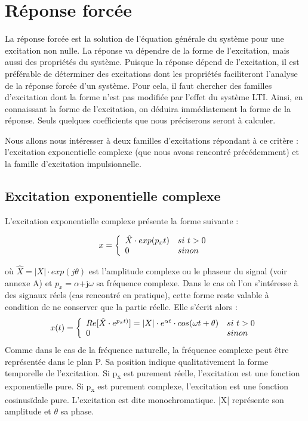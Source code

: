 	
	\section{Réponse forcée}
	
	La réponse forcée est la solution de l'équation générale du système pour une excitation non nulle. La réponse va dépendre de la forme de l'excitation, mais aussi des
	propriétés du système. Puisque la réponse dépend de l'excitation, il est
	préférable de déterminer des excitations dont les propriétés
	faciliteront l'analyse de la réponse forcée d'un système. Pour cela, il
	faut chercher des familles d'excitation dont la forme n'est pas modifiée
	par l'effet du système LTI. Ainsi, en connaissant la forme de
	l'excitation, on déduira immédiatement la forme de la réponse. Seuls
	quelques coefficients que nous préciserons seront à calculer.
	
	Nous allons nous intéresser à deux familles d'excitations répondant à ce critère : l'excitation
	exponentielle complexe (que nous avons rencontré précédemment) et la
	famille d'excitation impulsionnelle.
	
	\subsection{Excitation exponentielle complexe}
	L'excitation exponentielle complexe présente la forme suivante :
	
	\begin{equation}\label{exc_expo_complexe}
		x =    \left \{
		\begin{array}{l l}
		\hat{X} \cdot exp(p_{x}t)  & si~t>0 \\
		0   & sinon \\
		\end{array}
		\right .
	\end{equation}
	
	où $ \hat{X} = |X| \cdot exp(j \theta)$ est l'amplitude complexe ou le phaseur du signal (voir annexe A) et $ p_{x} = \alpha $+j$ \omega $ sa fréquence complexe. Dans le cas où l'on s'intéresse à des signaux réels (cas rencontré en pratique), cette forme reste valable à condition de ne conserver que la partie réelle. Elle s'écrit alors :
	\begin{equation}\label{exc_expo_complexe_reel}
	x(t) =    \left \{
	\begin{array}{l l}
	Re[\hat{X} \cdot e^{p_{x}t)}] = |X| \cdot e^{\alpha t} \cdot cos(\omega t+\theta)  & si~t>0 \\
	0   & sinon \\
	\end{array}
	\right .
	\end{equation}
	Comme dans le cas de la fréquence naturelle, la fréquence complexe peut
	être représentée dans le plan P. Sa position indique qualitativement la
	forme temporelle de l'excitation. Si p\textsubscript{x} est purement
	réelle, l'excitation est une fonction exponentielle pure. Si
	p\textsubscript{x} est purement complexe, l'excitation est une fonction
	cosinusïdale pure. L'excitation est dite monochromatique. |X| représente son amplitude et $\theta$ sa phase.
	
